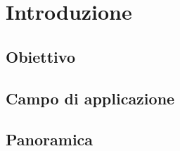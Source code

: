 \chapter{Introduzione}
\section{Obiettivo}
\kant[5]

\section{Campo di applicazione}
\kant[5]

\section{Panoramica}
\kant[5]
